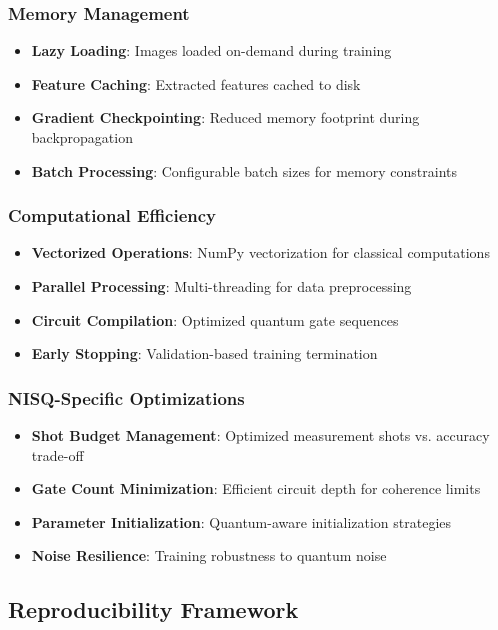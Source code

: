 \documentclass[conference]{IEEEtran}
\begin{document}
\subsubsection{Memory Management}
\begin{itemize}
    \item \textbf{Lazy Loading}: Images loaded on-demand during training
    \item \textbf{Feature Caching}: Extracted features cached to disk
    \item \textbf{Gradient Checkpointing}: Reduced memory footprint during backpropagation
    \item \textbf{Batch Processing}: Configurable batch sizes for memory constraints
\end{itemize}

\subsubsection{Computational Efficiency}
\begin{itemize}
    \item \textbf{Vectorized Operations}: NumPy vectorization for classical computations
    \item \textbf{Parallel Processing}: Multi-threading for data preprocessing
    \item \textbf{Circuit Compilation}: Optimized quantum gate sequences
    \item \textbf{Early Stopping}: Validation-based training termination
\end{itemize}

\subsubsection{NISQ-Specific Optimizations}
\begin{itemize}
    \item \textbf{Shot Budget Management}: Optimized measurement shots vs. accuracy trade-off
    \item \textbf{Gate Count Minimization}: Efficient circuit depth for coherence limits
    \item \textbf{Parameter Initialization}: Quantum-aware initialization strategies
    \item \textbf{Noise Resilience}: Training robustness to quantum noise
\end{itemize}

\subsection{Reproducibility Framework}
\end{document}
